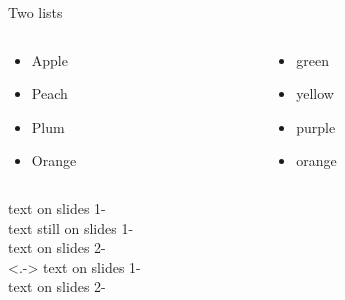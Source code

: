 \documentclass[\jobname]{beamer} %
\begin{document}
\begin{examp}
  \resetincr
  \begin{center}
    Two lists 
  \end{center}
  \begin{columns}
    \begin{column}{.2\textwidth}
      \begin{itemize}[<+-| alert@+>]
      \item Apple \item Peach \item Plum \item Orange
      \end{itemize}
    \end{column}
    \begin{column}{.2\textwidth}
      \resetincr[2]
      \begin{itemize}[<+-| alert@+>]
      \item green \item yellow \item purple \item orange
      \end{itemize}
    \end{column}
  \end{columns}
\end{examp}


\begin{examp}
  text on slides 1-\\
  \onslide<+->
  text still on slides 1-\\
  \onslide<+->
  text on slides 2-\\
  \resetincr\onslide<.->
  text on slides 1-\\
  \onslide<+->
  text on slides 2-
\end{examp}
\end{document}
